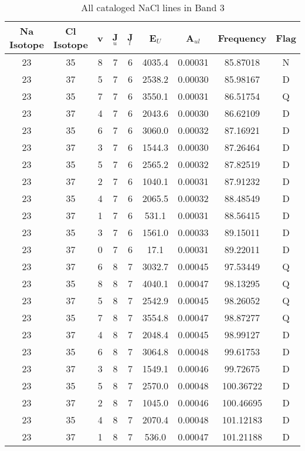 \begin{table*}[htp]
\centering
\caption{All cataloged NaCl lines in Band 3}
\begin{tabular}{ccccccccc}
\label{tab:Na_detections_B3}
Na Isotope & Cl Isotope & v & J$_u$ & J$_l$ & E$_U$ & A$_{ul}$ & Frequency & Flag \\
\hline
23 & 35 & 8 & 7 & 6 & 4035.4 & 0.00031 & 85.87018 & N \\
23 & 37 & 5 & 7 & 6 & 2538.2 & 0.00030 & 85.98167 & D \\
23 & 35 & 7 & 7 & 6 & 3550.1 & 0.00031 & 86.51754 & Q \\
23 & 37 & 4 & 7 & 6 & 2043.6 & 0.00030 & 86.62109 & D \\
23 & 35 & 6 & 7 & 6 & 3060.0 & 0.00032 & 87.16921 & D \\
23 & 37 & 3 & 7 & 6 & 1544.3 & 0.00030 & 87.26464 & D \\
23 & 35 & 5 & 7 & 6 & 2565.2 & 0.00032 & 87.82519 & D \\
23 & 37 & 2 & 7 & 6 & 1040.1 & 0.00031 & 87.91232 & D \\
23 & 35 & 4 & 7 & 6 & 2065.5 & 0.00032 & 88.48549 & D \\
23 & 37 & 1 & 7 & 6 & 531.1 & 0.00031 & 88.56415 & D \\
23 & 35 & 3 & 7 & 6 & 1561.0 & 0.00033 & 89.15011 & D \\
23 & 37 & 0 & 7 & 6 & 17.1 & 0.00031 & 89.22011 & D \\
23 & 37 & 6 & 8 & 7 & 3032.7 & 0.00045 & 97.53449 & Q \\
23 & 35 & 8 & 8 & 7 & 4040.1 & 0.00047 & 98.13295 & Q \\
23 & 37 & 5 & 8 & 7 & 2542.9 & 0.00045 & 98.26052 & Q \\
23 & 35 & 7 & 8 & 7 & 3554.8 & 0.00047 & 98.87277 & Q \\
23 & 37 & 4 & 8 & 7 & 2048.4 & 0.00045 & 98.99127 & D \\
23 & 35 & 6 & 8 & 7 & 3064.8 & 0.00048 & 99.61753 & D \\
23 & 37 & 3 & 8 & 7 & 1549.1 & 0.00046 & 99.72675 & D \\
23 & 35 & 5 & 8 & 7 & 2570.0 & 0.00048 & 100.36722 & D \\
23 & 37 & 2 & 8 & 7 & 1045.0 & 0.00046 & 100.46695 & D \\
23 & 35 & 4 & 8 & 7 & 2070.4 & 0.00048 & 101.12183 & D \\
23 & 37 & 1 & 8 & 7 & 536.0 & 0.00047 & 101.21188 & D \\
\hline
\end{tabular}

\par 
\end{table*}
